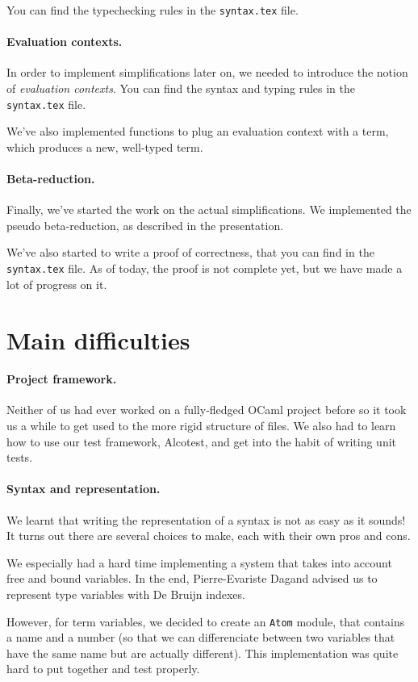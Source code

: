 \documentclass{article}
\begin{document}
You can find the typechecking rules in the {\tt syntax.tex} file.

\paragraph{Evaluation contexts.}In order to implement simplifications later on, we needed to 
introduce the notion of {\em evaluation contexts}. You can find the syntax and typing rules 
in the {\tt syntax.tex} file. 

We've also implemented functions to plug an evaluation context with a term, which produces a
new, well-typed term.

\paragraph{Beta-reduction.}Finally, we've started the work on the 
actual simplifications. We implemented the pseudo beta-reduction, as described in the 
presentation.

We've also started to write a proof of correctness, that you can find in the {\tt syntax.tex} file.
As of today, the proof is not complete yet, but we have made a lot of progress on it.


\section{Main difficulties}
\paragraph{Project framework.}Neither of us had ever worked on a fully-fledged OCaml project before
so it took us a while to get used to the more rigid structure of files. We also had to learn how to use 
our test framework, Alcotest, and get into the habit of writing unit tests.

\paragraph{Syntax and representation.}We learnt that writing the representation of a syntax 
is not as easy as it sounds!
It turns out there are several choices to make, each with their own pros and cons. 

We especially had a hard time implementing a system that takes into account free and bound variables.
In the end, Pierre-Evariste Dagand advised us to represent type variables with De Bruijn indexes.

However, for term variables, we decided to create an {\tt Atom} module, that contains 
a name and a number (so that we can differenciate between two variables that have the same 
name but are actually different).
This implementation was quite hard to put together and test properly.
\end{document}
